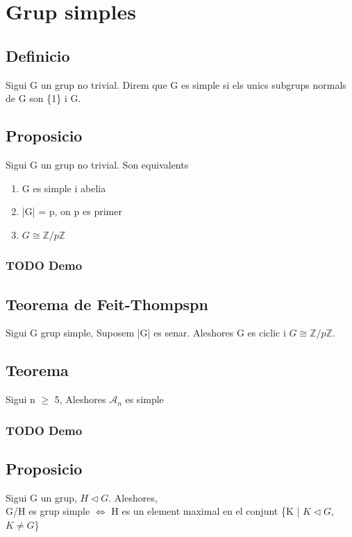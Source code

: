\documentclass[11pt]{article}
\begin{document}
\section{Grup simples}
\label{sec:orgb5ea09b}
\subsection{Definicio}
\label{sec:orgc85ae6c}
Sigui G un grup no trivial. Direm que G es simple si els unics subgrups normals de G son \{1\} i G.
\subsection{Proposicio}
\label{sec:org3a2459f}
Sigui G un grup no trivial. Son equivalents
\begin{enumerate}
\item G es simple i abelia
\item |G| = p, on p es primer
\item \(G \cong \mathbb{Z}/p\mathbb{Z}\)
\end{enumerate}

\subsubsection{{\bfseries\sffamily TODO} Demo}
\label{sec:org8baf1a8}
\subsection{Teorema de Feit-Thompspn}
\label{sec:orgfa76628}
Sigui G grup simple, Suposem |G| es senar. Aleshores G es ciclic i \(G \cong \mathbb{Z}/p\mathbb{Z}\).
\subsection{Teorema}
\label{sec:org076f5ea}
Sigui n \(\geq\) 5, Aleshores \(\mathcal{A}_n\) es simple
\subsubsection{{\bfseries\sffamily TODO} Demo}
\label{sec:org0c6d124}
\subsection{Proposicio}
\label{sec:org8d22086}
    Sigui G un grup, \(H \vartriangleleft G\). Aleshores,\\
G/H es grup simple \(\iff\) H es un element maximal en el conjunt \{K | \(K \vartriangleleft G\), \(K \neq G\)\}
\end{document}
